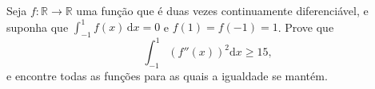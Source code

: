 Seja \(f\colon  \mathbb{R} \to \mathbb{R}\) uma função que é duas vezes continuamente diferenciável, e suponha que \(\int_{-1}^{1} f(x)\,\mathrm{d}x = 0\) e \(f(1) = f(-1) = 1\). Prove que
\[
\int_{-1}^{1} \left(f''(x)\right)^2 \mathrm{d}x \ge 15,
\]
e encontre todas as funções para as quais a igualdade se mantém.
